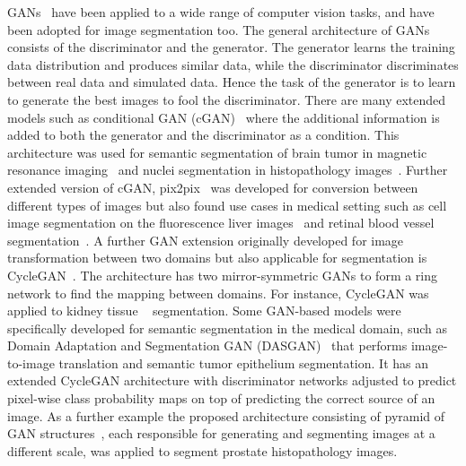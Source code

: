 GANs~\cite{goodfellow2014generative} have been applied to a wide range of computer vision tasks, and have been adopted for image segmentation too. The general architecture of GANs consists of the discriminator and the generator. The generator learns the training data distribution and produces similar data, while the discriminator discriminates between real data and simulated data. Hence the task of the generator is to learn to generate the best images to fool the discriminator. There are many extended models such as conditional GAN (cGAN)~\cite{mirza2014conditional} where the additional information is added to both the generator and the discriminator as a condition. This architecture was used for semantic segmentation of brain tumor in magnetic resonance imaging~\cite{rezaei2017conditional} and nuclei segmentation in histopathology images~\cite{mahmood2019deep}. Further extended version of cGAN, pix2pix~\cite{isola2017image} was developed for conversion between different types of images but also found use cases in medical setting such as cell image segmentation on the fluorescence liver images~\cite{Tsuda_2019_CVPR_Workshops} and retinal blood vessel segmentation~\cite{popescu2021retinal}. A further GAN extension originally developed for image transformation between two domains but also applicable for segmentation is CycleGAN~\cite{zhu2017unpaired}. The architecture has two mirror-symmetric GANs to form a ring network to find the mapping between domains. For instance, CycleGAN was applied to kidney tissue ~\cite{gadermayr2019generative} segmentation. Some GAN-based models were specifically developed for semantic segmentation in the medical domain, such as Domain Adaptation and Segmentation GAN (DASGAN)~\cite{kapil2019dasgan} that performs image-to-image translation and semantic tumor epithelium segmentation. It has an extended CycleGAN architecture with discriminator networks adjusted to predict pixel-wise class probability maps on top of predicting the correct source of an image. As a further example the proposed architecture consisting of pyramid of GAN structures~\cite{li2022high}, each responsible for generating and segmenting images at a different scale, was applied to segment prostate histopathology images.

